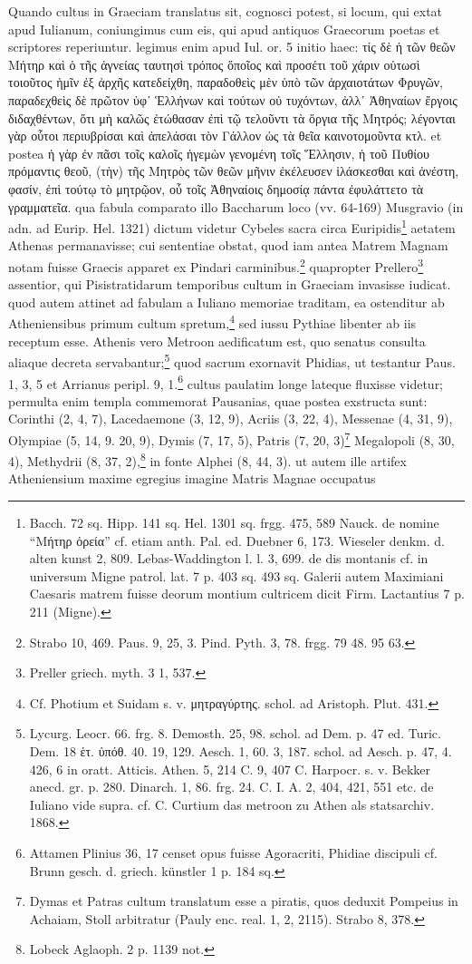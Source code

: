 \documentclass[a4paper, 11pt, oneside, polutonikogreek, german, twocolumn]{article}
\begin{document}
Quando cultus in Graeciam translatus sit, cognosci potest, si locum, qui extat apud Iulianum, coniungimus cum eis, qui apud antiquos Graecorum poetas et scriptores reperiuntur. legimus enim apud Iul. or. 5 initio haec: τίς δὲ ἡ τῶν θεῶν Μήτηρ καὶ ὁ τῆς ἁγνείας ταυτησὶ τρόπος ὅποῖος καὶ προσέτι τοῦ χάριν οὑτωσὶ τοιοῦτος ἡμῖν ἐξ ἀρχῆς κατεδείχθη, παραδοθεὶς μὲν ὑπὸ τῶν ἀρχαιοτάτων Φρυγῶν, παραδεχθεὶς δὲ πρῶτον ὑφ᾿ Ἑλλήνων καὶ τούτων οὐ τυχόντων, ἀλλ᾿ Ἀθηναίων ἔργοις διδαχθέντων, ὅτι μὴ καλῶς ἐτώθασαν ἐπὶ τῷ τελοῦντι τὰ ὄργια τῆς Μητρός; λέγονται γὰρ οὗτοι περιυβρίσαι καὶ ἀπελάσαι τὸν Γάλλον ὡς τὰ θεῖα καινοτομοῦντα κτλ. et postea ἡ γὰρ ἐν πᾶσι τοῖς καλοῖς ἡγεμὼν γενομένη τοῖς Ἕλλησιν, ἡ τοῦ Πυθίου πρόμαντις θεοῦ, (τὴν) τῆς Μητρὸς τῶν θεῶν μῆνιν ἐκέλευσεν ἱλάσκεσθαι καὶ ἀνέστη, φασίν, ἐπὶ τούτῳ τὸ μητρῷον, οὗ τοῖς Ἀθηναίοις δημοσίᾳ πάντα ἐφυλάττετο τὰ γραμματεῖα. qua fabula comparato illo Baccharum loco (vv. 64-169) Musgravio (in adn. ad Eurip. Hel. 1321) dictum videtur Cybeles sacra circa Euripidis\footnote{Bacch. 72 sq. Hipp. 141 sq. Hel. 1301 sq. frgg. 475, 589 Nauck. de nomine "`Μήτηρ ὀρεία"' cf. etiam anth. Pal. ed. Duebner 6, 173. Wieseler denkm. d. alten kunst 2, 809. Lebas-Waddington l. l. 3, 699. de dis montanis cf. in universum Migne patrol. lat. 7 p. 403 sq. 493 sq. Galerii autem Maximiani Caesaris matrem fuisse deorum montium cultricem dicit Firm. Lactantius 7 p. 211 (Migne).} aetatem Athenas permanavisse; cui sententiae obstat, quod iam antea Matrem Magnam notam fuisse Graecis apparet ex Pindari carminibus.\footnote{Strabo 10, 469. Paus. 9, 25, 3. Pind. Pyth. 3, 78. frgg. 79 48. 95 63.} quapropter Prellero\footnote{Preller griech. myth. 3 1, 537.} assentior, qui Pisistratidarum temporibus cultum in Graeciam invasisse iudicat. quod autem attinet ad fabulam a Iuliano memoriae traditam, ea ostenditur ab Atheniensibus primum cultum spretum,\footnote{Cf. Photium et Suidam s. v. μητραγύρτης. schol. ad Aristoph. Plut. 431.} sed iussu Pythiae libenter ab iis receptum esse. Athenis vero Metroon aedificatum est, quo senatus consulta aliaque decreta servabantur;\footnote{Lycurg. Leocr. 66. frg. 8. Demosth. 25, 98. schol. ad Dem. p. 47 ed. Turic. Dem. 18 ἑτ. ὑπόθ. 40. 19, 129. Aesch. 1, 60. 3, 187. schol. ad Aesch. p. 47, 4. 426, 6 in oratt. Atticis. Athen. 5, 214 C. 9, 407 C. Harpocr. s. v. Bekker anecd. gr. p. 280. Dinarch. 1, 86. frg. 24. C. I. A. 2, 404, 421, 551 etc. de Iuliano vide supra. cf. C. Curtium das metroon zu Athen als statsarchiv. 1868.} quod sacrum exornavit Phidias, ut testantur Paus. 1, 3, 5 et Arrianus peripl. 9, 1.\footnote{Attamen Plinius 36, 17 censet opus fuisse Agoracriti, Phidiae discipuli cf. Brunn gesch. d. griech. künstler 1 p. 184 sq.} cultus paulatim longe lateque fluxisse videtur; permulta enim templa commemorat Pausanias, quae postea exstructa sunt: Corinthi (2, 4, 7), Lacedaemone (3, 12, 9), Acriis (3, 22, 4), Messenae (4, 31, 9), Olympiae (5, 14, 9. 20, 9), Dymis (7, 17, 5), Patris (7, 20, 3)\footnote{Dymas et Patras cultum translatum esse a piratis, quos deduxit Pompeius in Achaiam, Stoll arbitratur (Pauly enc. real. 1, 2, 2115). Strabo 8, 378.} Megalopoli (8, 30, 4), Methydrii (8, 37, 2),\footnote{Lobeck Aglaoph. 2 p. 1139 not.} in fonte Alphei (8, 44, 3). ut autem ille artifex Atheniensium maxime egregius imagine Matris Magnae occupatus 
\end{document}
